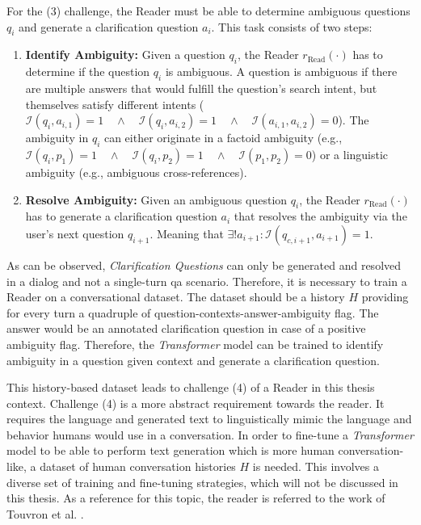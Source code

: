 For the (3) challenge, the Reader must be able to determine ambiguous questions $q_{i}$ and generate a clarification question $a_i$. This task consists of two steps:

\begin{enumerate}
    \item \textbf{Identify Ambiguity:} Given a question $q_i$, the Reader $r_{\text{Read}}(\cdot)$ has to determine if the question $q_i$ is ambiguous. A question is ambiguous if there are multiple answers that would fulfill the question's search intent, but themselves satisfy different intents ($\mathcal{I}(q_{i}, a_{i,1}) = 1 \quad \allowbreak \land \quad \allowbreak \mathcal{I}(q_{i}, a_{i,2}) = 1 \quad \allowbreak \land \quad \allowbreak \mathcal{I}(a_{i,1},a_{i,2}) = 0$). The ambiguity in $q_i$ can either originate in a factoid ambiguity (e.g., $\mathcal{I}(q_{i}, p_1) = 1 \quad \land \quad \mathcal{I}(q_{i}, p_2) = 1 \quad \land \quad \mathcal{I}(p_1, p_2) = 0$) or a linguistic ambiguity (e.g., ambiguous cross-references).
    \item \textbf{Resolve Ambiguity:} Given an ambiguous question $q_i$, the Reader $r_{\text{Read}}(\cdot)$ has to generate a clarification question $a_i$ that resolves the ambiguity via the user's next question $q_{i+1}$. Meaning that $\exists! a_{i+1} : \mathcal{I}(q_{c,i+1}, a_{i+1}) = 1$.
\end{enumerate}

As can be observed, \textit{Clarification Questions} can only be generated and resolved in a dialog and not a single-turn \gls{qa} scenario. Therefore, it is necessary to train a Reader on a conversational dataset. The dataset should be a history $H$ providing for every turn a quadruple of question-contexts-answer-ambiguity flag. The answer would be an annotated clarification question in case of a positive ambiguity flag. Therefore, the \textit{Transformer} model can be trained to identify ambiguity in a question given context and generate a clarification question.

This history-based dataset leads to challenge (4) of a Reader in this thesis context. Challenge (4) is a more abstract requirement towards the reader. It requires the language and generated text to linguistically mimic the language and behavior humans would use in a conversation. In order to fine-tune a \textit{Transformer} model to be able to perform text generation which is more human conversation-like, a dataset of human conversation histories $H$ is needed. This involves a diverse set of training and fine-tuning strategies, which will not be discussed in this thesis. As a reference for this topic, the reader is referred to the work of Touvron et al. \cite{touvron_llama_2023}.


